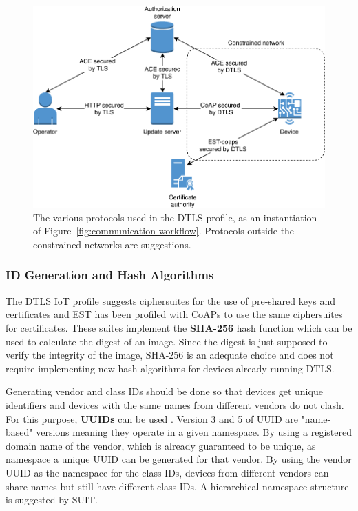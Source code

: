 \documentclass[0-thesis.tex]{subfiles}
\begin{document}
\begin{figure}[t]
    \caption{The various protocols used in the DTLS profile, as an instantiation of
    Figure~\ref{fig:communication-workflow}. Protocols outside the constrained networks are suggestions.}
    \label{fig:dtls-profile}
    \includegraphics{images/dtls-profile.pdf}
\end{figure}

\subsubsection{ID Generation and Hash Algorithms}
\label{sssec:hash-id-algorithm}
The DTLS IoT profile suggests ciphersuites for the use of pre-shared keys and certificates
and EST has been profiled with CoAPs to use the same ciphersuites for certificates. These
suites implement the \textbf{SHA-256} hash function which can be used to calculate the
digest of an image. Since the digest is just supposed to verify the integrity of the
image, SHA-256 is an adequate choice and does not require implementing new hash algorithms
for devices already running DTLS.

Generating vendor and class IDs should be done so that devices get unique identifiers and
devices with the same names from different vendors do not clash. For this purpose,
\textbf{UUIDs} can be used \parencite{rfc4122}. Version 3 and 5 of UUID are "name-based"
versions meaning they operate in a given namespace. By using a registered domain name of
the vendor, which is already guaranteed to be unique, as namespace a unique UUID can be
generated for that vendor. By using the vendor UUID as the namespace for the class IDs,
devices from different vendors can share names but still have different class IDs. A
hierarchical namespace structure is suggested by SUIT.
\end{document}
